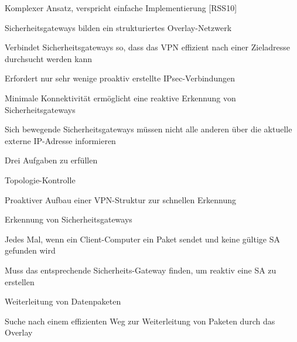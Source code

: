 \documentclass[a4paper]{article}
\begin{document}
\begin{multicols}{3}
\begin{itemize*}
            \begin{itemize*}
                  \item
                  Komplexer Ansatz, verspricht einfache Implementierung {[}RSS10{]}
                  \item
                  Sicherheitsgateways bilden ein strukturiertes Overlay-Netzwerk

                  \begin{itemize*}
                        \item Verbindet Sicherheitsgateways so, dass das VPN effizient nach einer Zieladresse durchsucht werden kann
                  \end{itemize*}
                  \item
                  Erfordert nur sehr wenige proaktiv erstellte IPsec-Verbindungen

                  \begin{itemize*}
                        \item Minimale Konnektivität ermöglicht eine reaktive Erkennung von Sicherheitsgateways
                        \item Sich bewegende Sicherheitsgateways müssen nicht alle anderen über die aktuelle externe IP-Adresse informieren
                  \end{itemize*}
                  \item
                  Drei Aufgaben zu erfüllen

                  \begin{itemize*}
                        \item Topologie-Kontrolle
                        \begin{itemize*} \item Proaktiver Aufbau einer VPN-Struktur zur schnellen Erkennung \end{itemize*}
                        \item Erkennung von Sicherheitsgateways
                        \begin{itemize*} \item Jedes Mal, wenn ein Client-Computer ein Paket sendet und keine gültige SA gefunden wird \item Muss das entsprechende Sicherheits-Gateway finden, um reaktiv eine SA zu erstellen \end{itemize*}
                        \item Weiterleitung von Datenpaketen
                        \begin{itemize*} \item Suche nach einem effizienten Weg zur Weiterleitung von Paketen durch das Overlay \end{itemize*}
                  \end{itemize*}
            \end{itemize*}



\end{itemize*}
\end{multicols}
\end{document}
